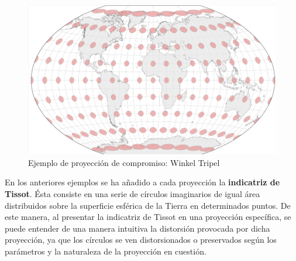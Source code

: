 \documentclass[
]{report}
\theoremstyle{definition}
\theoremstyle{definition}
\theoremstyle{definition}
\theoremstyle{definition}
\theoremstyle{remark}
\begin{document}
\begin{figure}

{\centering \includegraphics[width=0.3\linewidth]{img/comp} 

}

\caption{Ejemplo de proyección de compromiso: Winkel Tripel}\label{fig:comp}
\end{figure}

En los anteriores ejemplos se ha añadido a cada proyección la \textbf{indicatriz de
Tissot}. Ésta consiste en una serie de círculos imaginarios de igual área
distribuidos sobre la superficie esférica de la Tierra en determinados puntos.
De este manera, al presentar la indicatriz de Tissot en una proyección
específica, se puede entender de una manera intuitiva la distorsión provocada
por dicha proyección, ya que los círculos se ven distorsionados o preservados
según los parámetros y la naturaleza de la proyección en cuestión.

  
\end{document}
